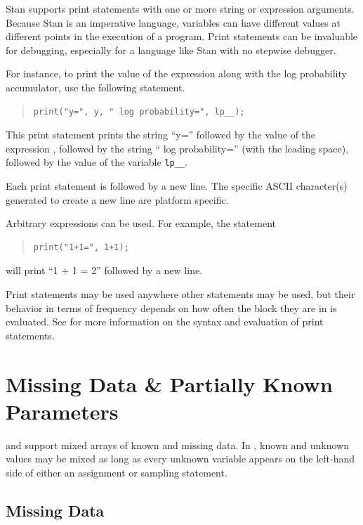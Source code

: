 Stan supports print statements with one or more string or expression
arguments.  Because Stan is an imperative language, variables can have
different values at different points in the execution of a program.
Print statements can be invaluable for debugging, especially for a
language like Stan with no stepwise debugger.

For instance, to print the value of the expression  along with
the log probability accumulator, use the following statement.
%
\begin{quote}
\begin{Verbatim}
print("y=", y, " log probability=", lp__);
\end{Verbatim}
\end{quote}
%
This print statement prints the string ``y='' followed by the value of
the expression , followed by the string `` log probability=''
(with the leading space), followed by the value of the variable
\Verb|lp__|. 

Each print statement is followed by a new line.  The specific ASCII
character(s) generated to create a new line are platform specific.

Arbitrary expressions can be used.  For example, the statement
\begin{quote}
\begin{Verbatim}
print("1+1=", 1+1);
\end{Verbatim}
\end{quote}
%
will print ``1 + 1 = 2'' followed by a new line.

Print statements may be used anywhere other statements may be used,
but their behavior in terms of frequency depends on how often the
block they are in is evaluated.  See  for
more information on the syntax and evaluation of print statements.


\chapter{Missing Data \& Partially Known Parameters}

\noindent
\BUGS and \R support mixed arrays of known and missing data.  In
\BUGS, known and unknown values may be mixed as long as every unknown
variable appears on the left-hand side of either an assignment or
sampling statement.  

\section{Missing Data}


